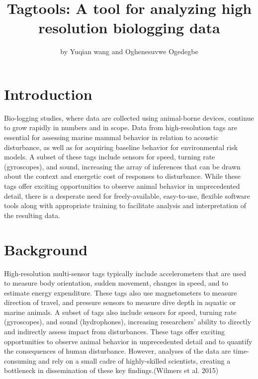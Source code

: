 \title{Tagtools: A tool for analyzing high resolution biologging data}


\author{by Yuqian wang and Oghenesuvwe Ogedegbe}

\maketitle


\hypertarget{introduction}{%
\section{Introduction}\label{introduction}}

Bio-logging studies, where data are collected using animal-borne devices, continue to grow rapidly in numbers and in scope. Data from high-resolution tags are essential for assessing marine mammal behavior in relation to acoustic disturbance, as well as for acquiring baseline behavior for environmental risk models. A subset of these tags include sensors for speed, turning rate (gyroscopes), and sound, increasing the array of inferences that can be drawn about the context and energetic cost of responses to disturbance. While these tags offer exciting opportunities to observe animal behavior in unprecedented detail, there is a desperate need for freely-available, easy-to-use, flexible software tools along with appropriate training to facilitate analysis and interpretation of the resulting data.

\hypertarget{background}{%
\section{Background}\label{background}}

High-resolution multi-sensor tags typically include accelerometers that are used to measure body orientation, sudden movement, changes in speed, and to estimate energy expenditure. These tags also use magnetometers to measure direction of travel, and pressure sensors to measure dive depth in aquatic or marine animals. A subset of tags also include sensors for speed, turning rate (gyroscopes), and sound (hydrophones), increasing researchers' ability to directly and indirectly assess impact from disturbances. These tags offer exciting opportunities to observe animal behavior in unprecedented detail and to quantify the consequences of human disturbance. However, analyses of the data are time-consuming and rely on a small cadre of highly-skilled scientists, creating a bottleneck in dissemination of these key findings.(Wilmers et al. 2015)

